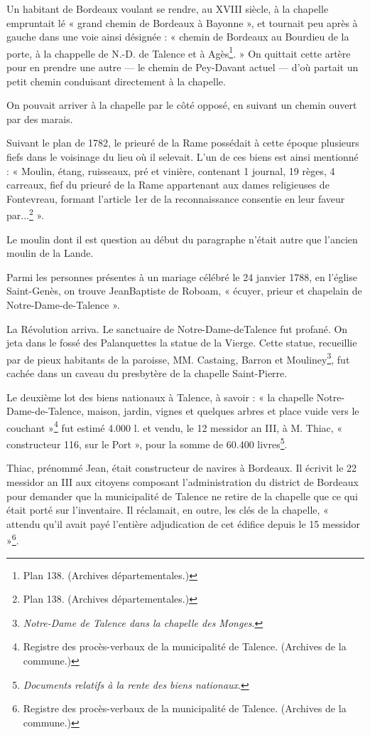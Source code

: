 \documentclass[a4paper,11pt]{book}
\begin{document}
Un habitant de Bordeaux voulant se rendre, au XVIII\ieme{} siècle, à la chapelle empruntait lé « grand chemin de Bordeaux à Bayonne », et tournait peu après à gauche dans une voie ainsi désignée : « chemin de Bordeaux au Bourdieu de la porte, à la chappelle de N.-D. de Talence et à Agès\footnote{Plan 138. (Archives départementales.)}. » On quittait cette artère pour en prendre une autre — le chemin de Pey-Davant actuel — d'où partait un petit chemin conduisant directement à la chapelle.

On pouvait arriver à la chapelle par le côté opposé, en suivant un chemin ouvert par des marais.

Suivant le plan de 1782, le prieuré de la Rame possédait à cette époque plusieurs fiefs dans le voisinage du lieu où il selevait. L'un de ces biens est ainsi mentionné : « Moulin, étang, ruisseaux, pré et vinière, contenant 1 journal, 19 règes, 4 carreaux, fief du prieuré de la Rame appartenant aux dames religieuses de Fontevreau, formant l'article 1er de la reconnaissance consentie en leur faveur par...\footnote{Plan 138. (Archives départementales.)} ». 

Le moulin dont il est question au début du paragraphe n'était autre que l'ancien moulin de la Lande.

Parmi les personnes présentes à un mariage célébré le 24 janvier 1788, en l'église Saint-Genès, on trouve JeanBaptiste de Roboam, « écuyer, prieur et chapelain de Notre-Dame-de-Talence ».

La Révolution arriva. Le sanctuaire de Notre-Dame-deTalence fut profané. On jeta dans le fossé des Palanquettes la statue de la Vierge. Cette statue, recueillie par de pieux habitants de la paroisse, MM. Castaing, Barron et Mouliney\footnote{\textit{Notre-Dame de Talence dans la chapelle des Monges}.}, fut cachée dans un caveau du presbytère de la chapelle Saint-Pierre.

Le deuxième lot des biens nationaux à Talence, à savoir : « la chapelle Notre-Dame-de-Talence, maison, jardin, vignes et quelques arbres et place vuide vers le couchant »\footnote{Registre des procès-verbaux de la municipalité de Talence. (Archives de la commune.)} fut estimé 4.000 l. et vendu, le 12 messidor an III, à M. Thiac, « constructeur 116, sur le Port », pour la somme de 60.400 livres\footnote{\textit{Documents relatifs à la rente des biens nationaux}.}.

Thiac, prénommé Jean, était constructeur de navires à Bordeaux. Il écrivit le 22 messidor an III aux citoyens composant l'administration du district de Bordeaux pour demander que la municipalité de Talence ne retire de la chapelle que ce qui était porté sur l'inventaire. Il réclamait, en outre, les clés de la chapelle, « attendu qu'il avait payé l'entière adjudication de cet édifice depuis le 15 messidor »\footnote{Registre des procès-verbaux de la municipalité de Talence. (Archives de la commune.)}.
\end{document}
